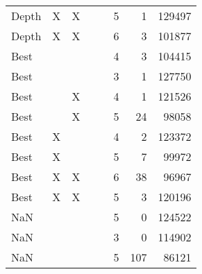 \begin{tabular}{lllllrrr}
      Depth &         X &        X &            &       &         5 &               1 &     129497 \\
      Depth &         X &        X &            &       &         6 &               3 &     101877 \\
       Best &           &          &            &       &         4 &               3 &     104415 \\
       Best &           &          &            &       &         3 &               1 &     127750 \\
       Best &           &        X &            &       &         4 &               1 &     121526 \\
       Best &           &        X &            &       &         5 &              24 &      98058 \\
       Best &         X &          &            &       &         4 &               2 &     123372 \\
       Best &         X &          &            &       &         5 &               7 &      99972 \\
       Best &         X &        X &            &       &         6 &              38 &      96967 \\
       Best &         X &        X &            &       &         5 &               3 &     120196 \\
        NaN &           &          &            &       &         5 &               0 &     124522 \\
        NaN &           &          &            &       &         3 &               0 &     114902 \\
        NaN &           &          &            &       &         5 &             107 &      86121 \\
\bottomrule
\end{tabular}
\unskip